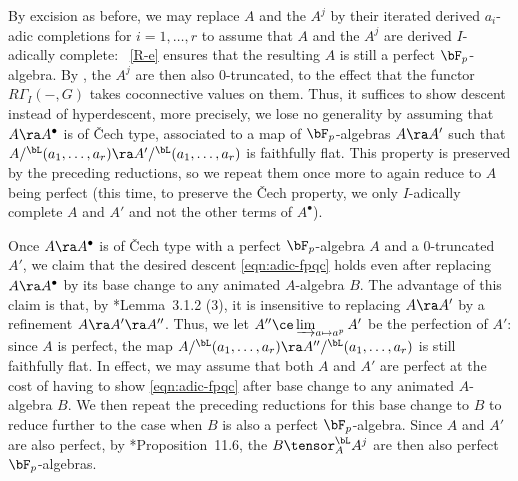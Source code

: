 By excision  as before, we may replace $A$ and the $A^j$ by their iterated derived $a_i$-adic completions for $i = 1, \dotsc, r$ to assume that $A$ and the $A^j$ are derived $I$-adically complete: ~\ref{R-e} ensures that the resulting $A$ is still a perfect $\bF_p$-algebra. By , the $A^j$ are then also $0$-truncated, to the effect that the functor $R\Gamma_I(-, G)$ takes coconnective values on them. Thus, it suffices to show descent instead of hyperdescent, more precisely, we lose no generality by assuming that $A \ra A^\bullet$ is of \v{C}ech type, associated to a map of $\bF_p$-algebras $A \ra A'$ such that $A/^\bL (a_1, \dotsc, a_r) \ra A'/^\bL (a_1, \dotsc, a_r)$ is faithfully flat. This property is preserved by the preceding reductions, so we repeat them once more to again reduce to $A$ being perfect (this time, to preserve the \v{C}ech property, we only $I$-adically complete $A$ and $A'$ and not the other terms of $A^\bullet$).

Once $A \ra A^\bullet$ is of \v{C}ech type with a perfect $\bF_p$-algebra $A$ and a $0$-truncated $A'$, we claim that the desired descent \eqref{eqn:adic-fpqc} holds even after replacing $A \ra A^\bullet$ by its base change to any animated $A$-algebra $B$. The advantage of this claim is that, by \cite{LZ17}*{Lemma~3.1.2 (3)},  it is insensitive to replacing $A \ra A'$ by a refinement $A \ra A' \ra A''$. Thus, we let $A'' \ce \varinjlim_{a \mapsto a^p} A'$ be the perfection of $A'$: since $A$ is perfect, the map $A/^\bL (a_1, \dotsc, a_r) \ra A'' /^\bL (a_1, \dotsc, a_r)$ is still faithfully flat. In effect, we may assume that both $A$ and $A'$ are perfect at the cost of having to show \eqref{eqn:adic-fpqc} after base change to any animated $A$-algebra $B$. We then repeat the preceding reductions for this base change to $B$ to reduce further to the case when $B$ is also a perfect $\bF_p$-algebra. Since $A$ and $A'$ are also perfect, by \cite{BS17}*{Proposition~11.6}, the $B \tensor^\bL_A A^j$ are then also perfect $\bF_p$-algebras.


